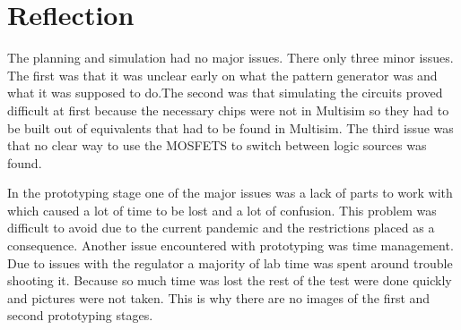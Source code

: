 \documentclass[12pt]{article}
\begin{document}
    \section{Reflection}
    The planning and simulation had no major issues. There only three minor issues. The first was that it was unclear early on what the pattern generator was and what it was supposed to do.The second was that simulating the circuits proved difficult at first because the necessary chips were not in Multisim so they had to be built out of equivalents that had to be found in Multisim. The third issue was that no clear way to use the MOSFETS to switch between logic sources was found.
    \par In the prototyping stage one of the major issues was a lack of parts to work with which caused a lot of time to be lost and a lot of confusion. This problem was difficult to avoid due to the current pandemic and the restrictions placed as a consequence. Another issue encountered with prototyping was time management. Due to issues with the regulator a majority of lab time was spent around trouble shooting it. Because so much time was lost the rest of the test were done quickly and pictures were not taken. This is why there are no images of the first and second prototyping stages.
\end{document}
